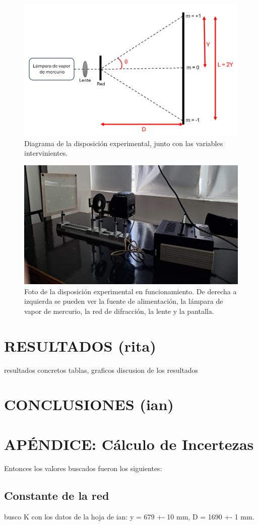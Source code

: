 \documentclass[12pt, a4paper]{article}
\begin{document}
\begin{figure}[!h] 
        \centering \includegraphics[width=0.5\columnwidth]{diagramaExperimental.png}
        \caption{\label{fig1}Diagrama de la disposición experimental, junto con las variables intervinientes.
        }
\end{figure}

\begin{figure}[!h] 
        \centering \includegraphics[width=0.5\columnwidth]{dispositivo2.jpg}
        \caption{\label{fig1}Foto de la disposición experimental en funcionamiento. De derecha a izquierda se pueden ver la fuente de alimentación, la lámpara de vapor de mercurio, la red de difracción, la lente y la pantalla.
        }
\end{figure}

\section{RESULTADOS (rita)}
resultados concretos
tablas, graficos
discusion de los resultados

\section{CONCLUSIONES (ian)}

\section{APÉNDICE: Cálculo de Incertezas}
Entonces los valores buscados fueron los siguientes:

\subsection{Constante de la red}
busco K con los datos de la hoja de ian: y = 679 +- 10 mm, D = 1690 +- 1 mm.
\end{document}

